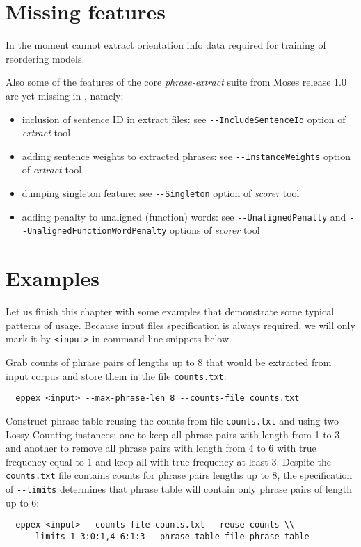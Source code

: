 \section{Missing features}

In the moment \eppex{} cannot extract orientation info data required for training
of reordering models.

Also some of the features of the core \emph{phrase-extract} suite from Moses
release 1.0 are yet missing in \eppex{}, namely:
\begin{itemize}
  \item inclusion of sentence ID in extract files: see \verb|--IncludeSentenceId|
    option of \emph{extract} tool
  \item adding sentence weights to extracted phrases: see \verb|--InstanceWeights|
    option of \emph{extract} tool
  \item dumping singleton feature: see \verb|--Singleton| option of \emph{scorer} tool
  \item adding penalty to unaligned (function) words: see \verb|--UnalignedPenalty|
    and \verb|--UnalignedFunctionWordPenalty| options of \emph{scorer} tool
\end{itemize}

\section{Examples}

Let us finish this chapter with some examples that demonstrate some typical
patterns of \eppex{} usage. Because input files specification is always required,
we will only mark it by \verb|<input>| in command line snippets below.

Grab counts of phrase pairs of lengths up to 8 that would be extracted from
input corpus and store them in the file \texttt{counts.txt}:
\begin{verbatim}
  eppex <input> --max-phrase-len 8 --counts-file counts.txt
\end{verbatim}

Construct phrase table reusing the counts from file \texttt{counts.txt} and using
two Lossy Counting instances: one to keep all phrase pairs with length from
1 to 3 and another to remove all phrase pairs with length from 4 to 6 with true
frequency equal to 1 and keep all with true frequency at least 3. Despite the
\texttt{counts.txt} file contains counts for phrase pairs lengths up to 8,
the specification of \verb|--limits| determines that phrase table will contain
only phrase pairs of length up to 6:
\begin{verbatim}
  eppex <input> --counts-file counts.txt --reuse-counts \\
    --limits 1-3:0:1,4-6:1:3 --phrase-table-file phrase-table
\end{verbatim}

